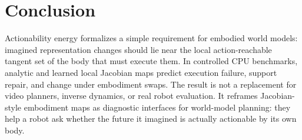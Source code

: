 \section{Conclusion}

Actionability energy formalizes a simple requirement for embodied world models: imagined representation changes should lie near the local action-reachable tangent set of the body that must execute them. In controlled CPU benchmarks, analytic and learned local Jacobian maps predict execution failure, support repair, and change under embodiment swaps. The result is not a replacement for video planners, inverse dynamics, or real robot evaluation. It reframes Jacobian-style embodiment maps as diagnostic interfaces for world-model planning: they help a robot ask whether the future it imagined is actually actionable by its own body.
